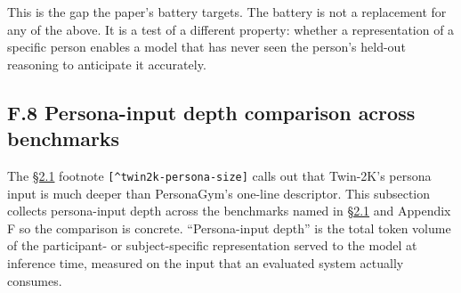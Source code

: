This is the gap the paper's battery targets. The battery is not a
replacement for any of the above. It is a test of a different property:
whether a representation of a specific person enables a model that has
never seen the person's held-out reasoning to anticipate it accurately.

\hypertarget{f.8-persona-input-depth-comparison-across-benchmarks}{%
\subsection{F.8 Persona-input depth comparison across
benchmarks}\label{f.8-persona-input-depth-comparison-across-benchmarks}}

The \hyperref[prior-measurement-targets-and-the-gap-representational-accuracy-fills]{§2.1} footnote \texttt{{[}\^{}twin2k-persona-size{]}} calls out that
Twin-2K's persona input is much deeper than PersonaGym's one-line
descriptor. This subsection collects persona-input depth across the
benchmarks named in \hyperref[prior-measurement-targets-and-the-gap-representational-accuracy-fills]{§2.1} and Appendix F so the comparison is concrete.
``Persona-input depth'' is the total token volume of the participant- or
subject-specific representation served to the model at inference time,
measured on the input that an evaluated system actually consumes.

